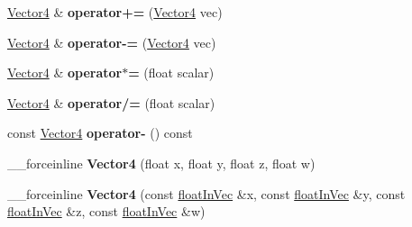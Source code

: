 \begin{DoxyCompactItemize}
\item 
\hypertarget{classVectormath_1_1Aos_1_1Vector4_a1ca5ff6ec1578bb214532738de8c93b5}{\hyperlink{classVectormath_1_1Aos_1_1Vector4}{Vector4} \& {\bfseries operator+=} (\hyperlink{classVectormath_1_1Aos_1_1Vector4}{Vector4} vec)}\label{classVectormath_1_1Aos_1_1Vector4_a1ca5ff6ec1578bb214532738de8c93b5}

\item 
\hypertarget{classVectormath_1_1Aos_1_1Vector4_ae3552f643afe821afa0b26cca19e3010}{\hyperlink{classVectormath_1_1Aos_1_1Vector4}{Vector4} \& {\bfseries operator-\/=} (\hyperlink{classVectormath_1_1Aos_1_1Vector4}{Vector4} vec)}\label{classVectormath_1_1Aos_1_1Vector4_ae3552f643afe821afa0b26cca19e3010}

\item 
\hypertarget{classVectormath_1_1Aos_1_1Vector4_ac7266ac9a7039e186458eebbaab9b2d9}{\hyperlink{classVectormath_1_1Aos_1_1Vector4}{Vector4} \& {\bfseries operator$\ast$=} (float scalar)}\label{classVectormath_1_1Aos_1_1Vector4_ac7266ac9a7039e186458eebbaab9b2d9}

\item 
\hypertarget{classVectormath_1_1Aos_1_1Vector4_a828cc75c1e71ecde819225ad1a8d5d7f}{\hyperlink{classVectormath_1_1Aos_1_1Vector4}{Vector4} \& {\bfseries operator/=} (float scalar)}\label{classVectormath_1_1Aos_1_1Vector4_a828cc75c1e71ecde819225ad1a8d5d7f}

\item 
\hypertarget{classVectormath_1_1Aos_1_1Vector4_ac816661256dbd7777f3e894ac50de9ee}{const \hyperlink{classVectormath_1_1Aos_1_1Vector4}{Vector4} {\bfseries operator-\/} () const }\label{classVectormath_1_1Aos_1_1Vector4_ac816661256dbd7777f3e894ac50de9ee}

\item 
\hypertarget{classVectormath_1_1Aos_1_1Vector4_a3a9a8ea181eeb2b2a3932149ad5c50ea}{\-\_\-\-\_\-forceinline {\bfseries Vector4} (float x, float y, float z, float w)}\label{classVectormath_1_1Aos_1_1Vector4_a3a9a8ea181eeb2b2a3932149ad5c50ea}

\item 
\hypertarget{classVectormath_1_1Aos_1_1Vector4_abb16ceb3a7f0e96f104266e2d59fc992}{\-\_\-\-\_\-forceinline {\bfseries Vector4} (const \hyperlink{classVectormath_1_1floatInVec}{float\-In\-Vec} \&x, const \hyperlink{classVectormath_1_1floatInVec}{float\-In\-Vec} \&y, const \hyperlink{classVectormath_1_1floatInVec}{float\-In\-Vec} \&z, const \hyperlink{classVectormath_1_1floatInVec}{float\-In\-Vec} \&w)}\label{classVectormath_1_1Aos_1_1Vector4_abb16ceb3a7f0e96f104266e2d59fc992}


\end{DoxyCompactItemize}
